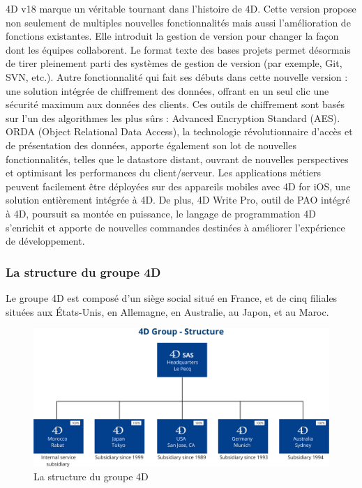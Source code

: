 4D v18 marque un véritable tournant dans l’histoire de 4D. 
Cette version propose non seulement de multiples nouvelles 
fonctionnalités mais aussi l’amélioration de fonctions existantes. 
Elle introduit la gestion de version pour changer la façon dont 
les équipes collaborent. Le format texte des bases projets permet 
désormais de tirer pleinement parti des systèmes de gestion de 
version (par exemple, Git, SVN, etc.). Autre fonctionnalité qui 
fait ses débuts dans cette nouvelle version : une solution intégrée
de chiffrement des données, offrant en un seul clic une sécurité
maximum aux données des clients. Ces outils de chiffrement sont
basés sur l’un des algorithmes les plus sûrs : Advanced 
Encryption Standard (AES). ORDA (Object Relational Data Access),
la technologie révolutionnaire d’accès et de présentation des 
données, apporte également son lot de nouvelles fonctionnalités,
telles que le datastore distant, ouvrant de nouvelles perspectives 
et optimisant les performances du client/serveur. Les applications métiers peuvent facilement être déployées sur des appareils mobiles avec 4D for iOS, une solution entièrement intégrée à 4D. De plus, 4D Write Pro, outil de PAO intégré à 4D, poursuit sa montée en puissance, le langage de programmation 4D s’enrichit et apporte de nouvelles commandes destinées à améliorer l’expérience de développement.



\subsubsection{La structure du groupe 4D}
Le groupe 4D est composé d’un siège social situé en France, et de cinq filiales situées
aux États-Unis, en Allemagne, en Australie, au Japon, et au Maroc.

\begin{figure}[h]
    \centering
    \includegraphics[scale=0.35]{Images/groupe.png} %
    \caption{ La structure du groupe 4D}
    \label{fig:groupe}
\end{figure}

